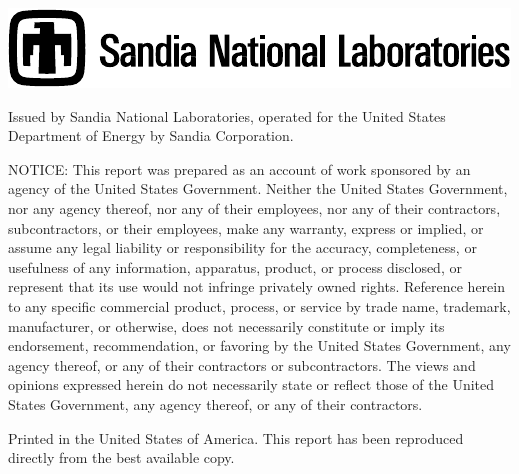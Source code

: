 {{\begin{minipage}[t]{6.0in}
{        \includegraphics{snllineblk}
        }
        \end{minipage}

        \newpage
        \hspace{1.0in}
        \begin{minipage}[t]{5.0in}
            \fontsize{9}{11pt}
            \selectfont

            Issued by Sandia National Laboratories, operated for the
            United States Department of Energy by Sandia Corporation.
            \vspace{\baselineskip}

            {\fontsize{11}{13pt}\selectfont NOTICE:}
            This report was prepared
            as an account of work sponsored by an agency of
            the United States Government. Neither the United
            States Government, nor any agency thereof, nor any
            of their employees, nor any of their contractors,
            subcontractors, or their employees, make any warranty,
            express or implied, or assume any legal liability or
            responsibility for the accuracy, completeness, or
            usefulness of any information, apparatus, product,
            or process disclosed, or represent that its use
            would not infringe privately owned rights. Reference
            herein to any specific commercial product, process,
            or service by trade name, trademark, manufacturer, or
            otherwise, does not necessarily constitute or imply
            its endorsement, recommendation, or favoring by the
            United States Government, any agency thereof, or any
            of their contractors or subcontractors. The views and
            opinions expressed herein do not necessarily state
            or reflect those of the United States Government,
            any agency thereof, or any of their contractors.
            \vspace{\baselineskip}

            Printed in the United States of America. This report has
            been reproduced directly from the best available copy.
            \vspace{\baselineskip}


\end{minipage}}}
